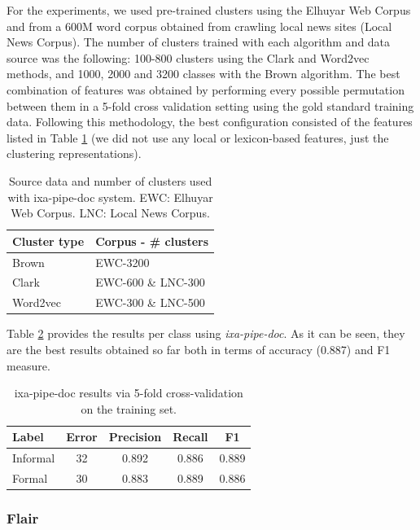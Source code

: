 \documentclass[information,article,submit,moreauthors,pdftex,10pt,a4paper]{Definitions/mdpi}
\begin{document}
For the experiments, we used pre-trained clusters using the Elhuyar Web Corpus \cite{leturia2012evaluating} and from a 600M word corpus obtained from crawling local news sites (Local News Corpus). The number of clusters trained with each algorithm and data source was the following: 100-800 clusters using the Clark and Word2vec methods, and 1000, 2000 and 3200 classes with the Brown algorithm. The best combination of features was obtained by performing every possible permutation between them in a 5-fold cross validation setting using the gold standard training data. Following this methodology, the best configuration consisted of the features listed in Table \ref{tab:clusters} (we did not use any local or lexicon-based features, just the clustering representations).

\begin{table}[H]
  \centering
  \begin{tabular}{l|l} \hline
    Cluster type & Corpus - \# clusters\\ \hline \hline
    Brown & EWC-3200 \\
    Clark & EWC-600 \& LNC-300  \\
    Word2vec & EWC-300 \& LNC-500\\ \hline
  \end{tabular}
  \caption{Source data and number of clusters used with ixa-pipe-doc system. EWC: Elhuyar Web Corpus. LNC: Local News Corpus.}
  \label{tab:clusters}
\end{table}


Table \ref{tab:ixa-ml-garapen} provides the results per class using \emph{ixa-pipe-doc}. As it can be seen, they are the best results obtained so far both in terms of accuracy (0.887) and F1 measure.

\begin{table}[H]
  \centering
  \begin{tabular}{lcccc}
    \hline
    Label & Error & Precision & Recall & F1\\ \hline \hline
    Informal & 32 & 0.892  & 0.886  & 0.889 \\
    Formal & 30 & 0.883 & 0.889 & 0.886 \\ \hline
  \end{tabular}
  \caption{ixa-pipe-doc results via 5-fold cross-validation on the training set.}
  \label{tab:ixa-ml-garapen}
\end{table}


\subsubsection{Flair}\label{sec:neural-architecture}
\end{document}
